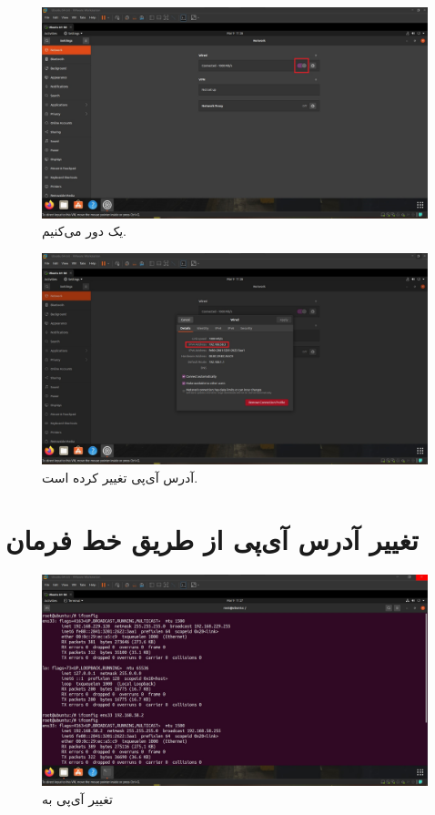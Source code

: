 \documentclass{article}
\begin{document}
\begin{figure}[H]
    \centering
    \includegraphics[width=1.0\textwidth]{figures/6d.jpg}
    \caption
	{
یک دور  می‌کنیم.
	}
    \label{fig:fig1}
\end{figure}
\begin{figure}[H]
    \centering
    \includegraphics[width=1.0\textwidth]{figures/6e.jpg}
    \caption
	{
آدرس آی‌پی تغییر کرده است.
	}
    \label{fig:fig1}
\end{figure}


\section{تغییر آدرس آی‌پی از طریق خط فرمان}
\begin{figure}[H]
    \centering
    \includegraphics[width=1.0\textwidth]{figures/7.jpg}
    \caption
	{
تغییر آی‌پی به 
	}
    \label{fig:fig1}
\end{figure}
\end{document}
